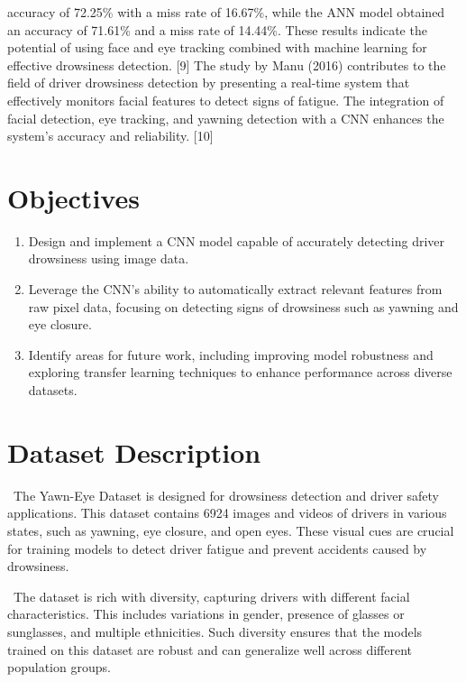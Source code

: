 \documentclass[conference]{IEEEtran}
\begin{document}
accuracy of 72.25\% with a miss rate of 16.67\%, while the ANN model obtained an accuracy of 71.61\% and a miss rate of 14.44\%. These results indicate the potential of using face and eye tracking combined with machine learning for effective drowsiness detection. [9] The study by Manu (2016) contributes to the field of driver drowsiness detection by presenting a real-time system that effectively monitors facial features to detect signs of fatigue. The integration of facial detection, eye tracking, and yawning detection with a CNN enhances the system’s accuracy and reliability. [10]

\section{Objectives}

\begin{enumerate}
    \item Design and implement a CNN model capable of accurately detecting driver drowsiness using image data.

    \item Leverage the CNN's ability to automatically extract relevant features from raw pixel data, focusing on detecting signs of drowsiness such as yawning and eye closure.

    \item  Identify areas for future work, including improving model robustness and exploring transfer learning techniques to enhance performance across diverse datasets.

\end{enumerate}

\section{Dataset Description}
\ The Yawn-Eye Dataset is designed for drowsiness detection and driver safety applications. This dataset contains 6924 images and videos of drivers in various states, such as yawning, eye closure, and open eyes. These visual cues are crucial for training models to detect driver fatigue and prevent accidents caused by drowsiness.

\ The dataset is rich with diversity, capturing drivers with different facial characteristics. This includes variations in gender, presence of glasses or sunglasses, and multiple ethnicities. Such diversity ensures that the models trained on this dataset are robust and can generalize well across different population groups.
\end{document}
